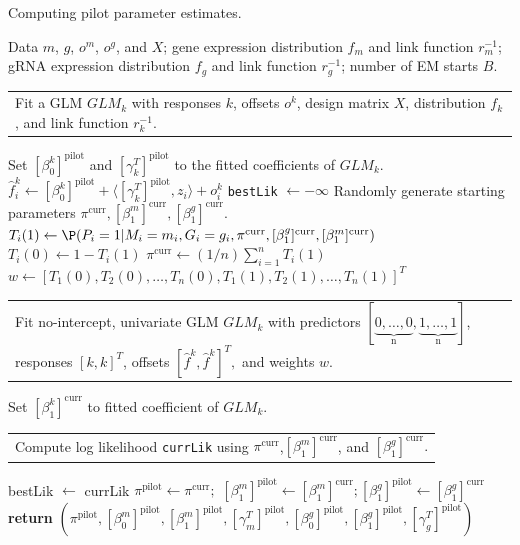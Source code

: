 \documentclass[12pt]{article}
\makeatletter
\newcommand{\multiline}[1]{%
	\begin{tabularx}{\dimexpr\linewidth-\ALG@thistlm}[t]{@{}X@{}}
		#1
	\end{tabularx}
}
\makeatother
\begin{document}
\begin{algorithm}
	\caption{Computing pilot parameter estimates.}\label{algo:pilot_estimates}
	\begin{algorithmic}[2]
		\Require Data $m$, $g$, $o^m$, $o^g$, and $X$; gene expression distribution $f_m$ and link function $r^{-1}_m$; gRNA expression distribution $f_g$ and link function $r^{-1}_g$; number of EM starts $B$.
		\State \multiline{Fit a GLM $GLM_k$ with responses $k$, offsets $o^k$, design matrix $X$, distribution $f_k$, and link function $r^{-1}_k$.}
		\State Set $[\beta_0^k]^\textrm{pilot}$ and $[\gamma_k^T]^\textrm{pilot}$ to the fitted coefficients of $GLM_k$.
		\State $\hat{f}^k_i \gets [\beta_0^k]^\textrm{pilot} + \langle [\gamma_k^T]^\textrm{pilot} , z_i \rangle + o_i^k$ 
		\EndFor
		\EndFor
		\State \texttt{bestLik} $\gets -\infty$ 
		\State Randomly generate starting parameters $\pi^\textrm{curr}, [\beta_1^m]^\textrm{curr}, [\beta^g_1]^\textrm{curr}.$
		 
		\State $T_i(1) \gets \P(P_i = 1 | M_i = m_i, G_i = g_i, \pi^\textrm{curr}, [\beta^g_1]^\textrm{curr}, [\beta_1^m]^\textrm{curr})$
		\State $T_i(0) \gets 1 - T_i(1)$
		\EndFor
		\State $\pi^{\textrm{curr}} \gets (1/n) \sum_{i=1}^n T_i(1)$ 
		\State $w \gets [T_1(0), T_2(0), \dots, T_n(0), T_1(1), T_2(1), \dots, T_n(1)]^T$
		\State \multiline{Fit no-intercept, univariate GLM $GLM_k$ with predictors $[\underbrace{0, \dots, 0}_\textrm{n}, \underbrace{1, \dots, 1}_\textrm{n}]$, responses $[k,k]^T$, offsets $[\hat{f}^k, \hat{f}^k]^T,$ and weights $w$.}
		\State Set $[\beta^k_1]^\textrm{curr}$ to fitted coefficient of $GLM_k$.
		\EndFor
		\State \multiline{
			Compute log likelihood \texttt{currLik} using $\pi^\textrm{curr}$,$ [\beta^m_1]^\textrm{curr}$, and $[\beta^g_1]^\textrm{curr}.$}
		\EndWhile
		\State bestLik $\gets$ currLik
		\State $\pi^\textrm{pilot} \gets \pi^\textrm{curr};$ $[\beta^m_1]^\textrm{pilot} \gets [\beta^m_1]^\textrm{curr}; [\beta^g_1]^\textrm{pilot} \gets [\beta^g_1]^\textrm{curr}$
		\EndIf
		\EndFor
		\State \textbf{return} $(\pi^\textrm{pilot}, [\beta^m_0]^\textrm{pilot}, [\beta^m_1]^\textrm{pilot}, [\gamma^T_m]^\textrm{pilot}, [\beta^g_0]^\textrm{pilot}, [\beta^g_1]^\textrm{pilot}, [\gamma^T_g]^\textrm{pilot})$
	\end{algorithmic}
\end{algorithm}
\end{document}
